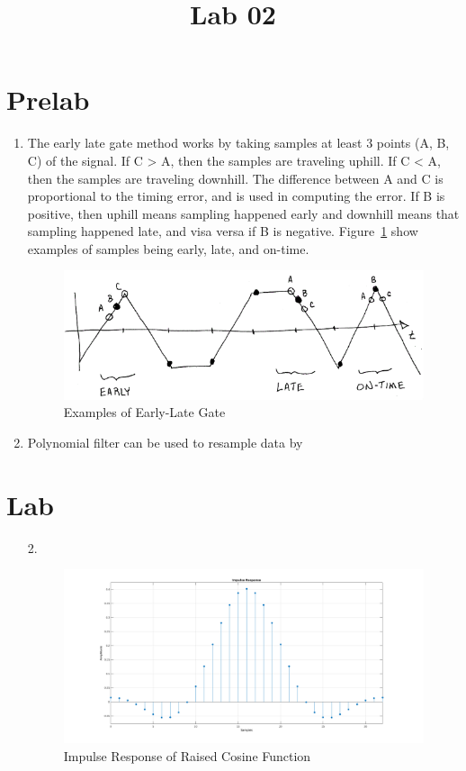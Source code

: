 \documentclass{article}
\begin{document}
\title{Lab 02}
\label{sec:title}

\section{Prelab}
\label{ssec:subtitle}

\begin{enumerate}
\item
The early late gate method works by taking samples at least 3 points (A, B, C) of the signal.
If C > A, then the samples are traveling uphill. If C < A, then the samples are traveling downhill.
The difference between A and C is proportional to the timing error, and is used in computing
the error. If B is positive, then uphill means sampling happened early and downhill means that
sampling happened late, and visa versa if B is negative. Figure~\ref{fig:earlylate} show examples
of samples being early, late, and on-time.

\begin{figure}[hb]
\centering
\label{fig:earlylate}
\includegraphics{LateEarlyGate.png}
\caption{Examples of Early-Late Gate}
\end{figure}

\item
Polynomial filter can be used to resample data by

\end{enumerate}

\section{Lab}
\label{ssec:another_subtitle}
\begin{enumerate}
\item[2.]

\begin{figure}[hb]
\centering
\label{fig:ImpulseResRC}
\includegraphics[width=\linewidth]{ImpulseResRC.png}
\caption{Impulse Response of Raised Cosine Function}
\end{figure}

\end{enumerate}
\end{document}
